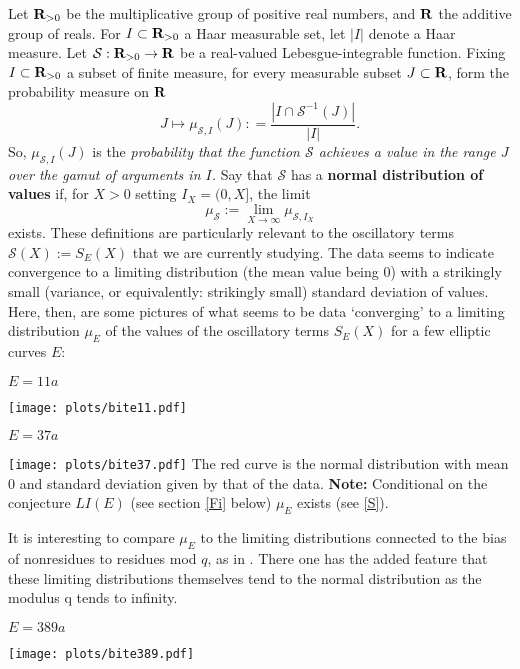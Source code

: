 \documentclass[11pt]{article}
\theoremstyle{plain}
\theoremstyle{definition}
\numberwithin{equation}{section}
\numberwithin{figure}{section}
\numberwithin{table}{section}
\def\S{\mathcal{S}}
\def\R{{\bf R}}
\begin{document}
Let ${\R}_{>0}$ be the multiplicative group of positive real numbers, and ${\R}$ the additive group of reals. For $I \subset {\R}_{>0}$ a Haar measurable set, let $|I|$ denote a Haar measure.  Let ${\S}:{\R}_{>0} \to {\R}$ be a real-valued Lebesgue-integrable function.  Fixing $I \subset {\R}_{>0}$ a subset  of finite measure,  for every measurable subset $J\subset {\R}$, form the probability measure on ${\R}$
$$J\mapsto \mu_{{\S},I}(J): = {\frac{|I\cap {\S}^{-1}(J)|}{|I|}}.$$  So, $\mu_{{\S},I}(J)$ is the {\it probability that the function ${\S}$ achieves a value in the range $J$ over the gamut of arguments in $I$.}   Say that ${\S}$ has a {\bf normal distribution of values} if, for $X > 0$ setting $I_X= (0,X]$, the limit  $$\mu_{{\S}}:= \lim_{X \to \infty}\mu_{{\S},I_X}$$ exists. These  definitions are particularly relevant to the oscillatory terms ${\S}(X):= S_E(X)$ that we are currently studying. The data seems to indicate convergence to a limiting distribution (the  mean  value being $0$) with a strikingly small (variance, or equivalently: strikingly small) standard deviation of values.
\vskip20pt
Here, then, are some pictures  of what seems to be data `converging' to a limiting  distribution $\mu_E$ of the values of the oscillatory terms $S_E(X)$ for a few elliptic curves $E$:
  \vskip10pt
  \centerline{ $E = 11a$}
 \vskip10pt
 \hskip100pt \texttt{[image: plots/bite11.pdf]}
    \vskip10pt
  \centerline{ $E = 37a$}
  \vskip10pt
 \hskip100pt \texttt{[image: plots/bite37.pdf]}
    \vskip10pt
       The red curve is the normal distribution with mean $0$ and standard deviation given by that of the data.
   \vskip10pt
    {\bf  Note: } Conditional on the conjecture $LI(E)$ (see section \ref{Fi} below) $\mu_E$ exists (see \ref{S}).

     It is interesting  to compare $\mu_E$ to the limiting distributions connected to the bias of nonresidues to residues mod $q$, as in \cite{R-S}. There one has the added feature that these limiting distributions themselves tend to the normal distribution as the modulus q tends to infinity.
  \centerline{ $E = 389a$}
  \vskip10pt
\hskip100pt  \texttt{[image: plots/bite389.pdf]}

\end{document}
